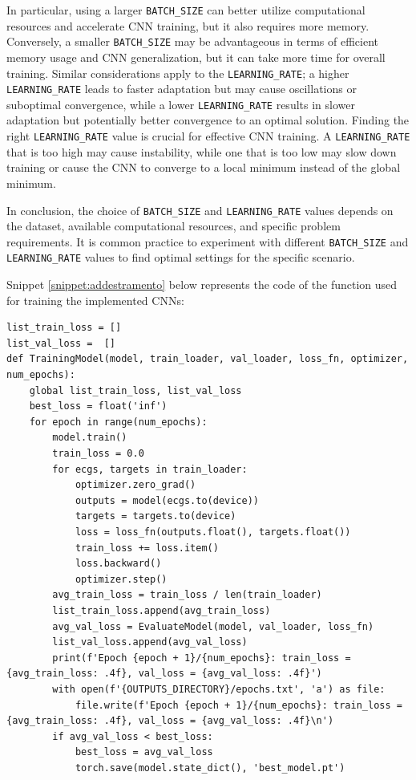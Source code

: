 \documentclass[12pt,italian]{report}
\begin{document}
In particular, using a larger \texttt{BATCH\_SIZE} can better utilize computational resources and accelerate CNN training, but it also requires more memory. Conversely, a smaller \texttt{BATCH\_SIZE} may be advantageous in terms of efficient memory usage and CNN generalization, but it can take more time for overall training. Similar considerations apply to the \texttt{LEARNING\_RATE}; a higher \texttt{LEARNING\_RATE} leads to faster adaptation but may cause oscillations or suboptimal convergence, while a lower \texttt{LEARNING\_RATE} results in slower adaptation but potentially better convergence to an optimal solution. Finding the right \texttt{LEARNING\_RATE} value is crucial for effective CNN training. A \texttt{LEARNING\_RATE} that is too high may cause instability, while one that is too low may slow down training or cause the CNN to converge to a local minimum instead of the global minimum.

In conclusion, the choice of \texttt{BATCH\_SIZE} and \texttt{LEARNING\_RATE} values depends on the dataset, available computational resources, and specific problem requirements. It is common practice to experiment with different \texttt{BATCH\_SIZE} and \texttt{LEARNING\_RATE} values to find optimal settings for the specific scenario.

Snippet \ref{snippet:addestramento} below represents the code of the function used for training the implemented CNNs:

\lstset{language=Python}
\begin{lstlisting}[aboveskip=15pt, belowskip=15pt, basicstyle=\fontsize{8}{10}\selectfont, keywordstyle=\color{blue}, breaklines=true, label=snippet:addestramento]
list_train_loss = []
list_val_loss =  []
def TrainingModel(model, train_loader, val_loader, loss_fn, optimizer, num_epochs):
    global list_train_loss, list_val_loss
    best_loss = float('inf')
    for epoch in range(num_epochs):
        model.train()
        train_loss = 0.0
        for ecgs, targets in train_loader:
            optimizer.zero_grad()
            outputs = model(ecgs.to(device))
            targets = targets.to(device)
            loss = loss_fn(outputs.float(), targets.float())
            train_loss += loss.item()
            loss.backward()
            optimizer.step()
        avg_train_loss = train_loss / len(train_loader)
        list_train_loss.append(avg_train_loss)
        avg_val_loss = EvaluateModel(model, val_loader, loss_fn)
        list_val_loss.append(avg_val_loss)
        print(f'Epoch {epoch + 1}/{num_epochs}: train_loss = {avg_train_loss: .4f}, val_loss = {avg_val_loss: .4f}')
        with open(f'{OUTPUTS_DIRECTORY}/epochs.txt', 'a') as file:
            file.write(f'Epoch {epoch + 1}/{num_epochs}: train_loss = {avg_train_loss: .4f}, val_loss = {avg_val_loss: .4f}\n')
        if avg_val_loss < best_loss:
            best_loss = avg_val_loss
            torch.save(model.state_dict(), 'best_model.pt')
\end{lstlisting}
\end{document}
